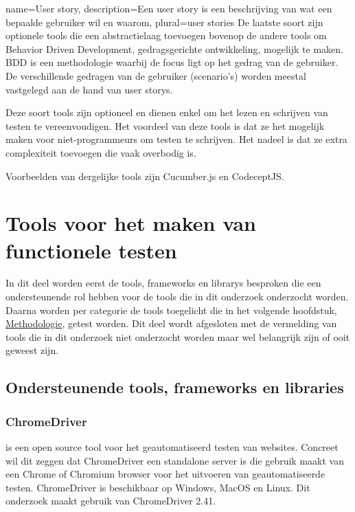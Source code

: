 {
    name=User story,
    description={Een user story is een beschrijving van wat een bepaalde gebruiker wil en waarom},
    plural={user stories}
}
De laatste soort zijn optionele \glspl{tool} die een abstractielaag toevoegen bovenop de andere \glspl{tool} om Behavior Driven Development, gedragsgerichte ontwikkeling, mogelijk te maken. \gls{BDD} is een methodologie waarbij de focus ligt op het gedrag van de gebruiker. De verschillende gedragen van de gebruiker (scenario's)  worden meestal vastgelegd aan de hand van \glspl{user story}.

Deze soort \glspl{tool} zijn optioneel en dienen enkel om het lezen en schrijven van testen te vereenvoudigen. Het voordeel van deze \glspl{tool} is dat ze het mogelijk maken voor niet-programmeurs om testen te schrijven. Het nadeel is dat ze extra complexiteit toevoegen die vaak overbodig is.

Voorbeelden van dergelijke \glspl{tool} zijn Cucumber.js en CodeceptJS.

\clearpage
\section{Tools voor het maken van functionele testen}
In dit deel worden eerst de \glspl{tool}, \glspl{framework} en \glspl{library} besproken die een ondersteunende rol hebben voor de \glspl{tool} die in dit onderzoek onderzocht worden. Daarna worden per categorie de \glspl{tool} toegelicht die in het volgende hoofdstuk, \hyperref[ch:methodologie]{Methodologie}, getest worden. Dit deel wordt afgesloten met de vermelding van \glspl{tool} die in dit onderzoek niet onderzocht worden maar wel belangrijk zijn of ooit geweest zijn.

\subsection{Ondersteunende tools, frameworks en libraries}

\subsubsection{ChromeDriver}
\label{chromedriver}
\textcite{ChromeDriver2018} is een open source \gls{tool} voor het geautomatiseerd testen van websites. Concreet wil dit zeggen dat ChromeDriver een standalone server is die gebruik maakt van een Chrome of Chromium browser voor het uitvoeren van geautomatiseerde testen. ChromeDriver is beschikbaar op Windows, MacOS en Linux. Dit onderzoek maakt gebruik van ChromeDriver 2.41.

